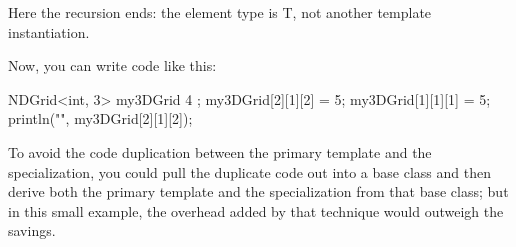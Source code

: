 Here the recursion ends: the element type is T, not another template instantiation.

Now, you can write code like this:

\begin{cpp}
NDGrid<int, 3> my3DGrid { 4 };
my3DGrid[2][1][2] = 5;
my3DGrid[1][1][1] = 5;
println("{}", my3DGrid[2][1][2]);
\end{cpp}

To avoid the code duplication between the primary template and the specialization, you could pull the duplicate code out into a base class and then derive both the primary template and the specialization from that base class; but in this small example, the overhead added by that technique would outweigh the savings.













